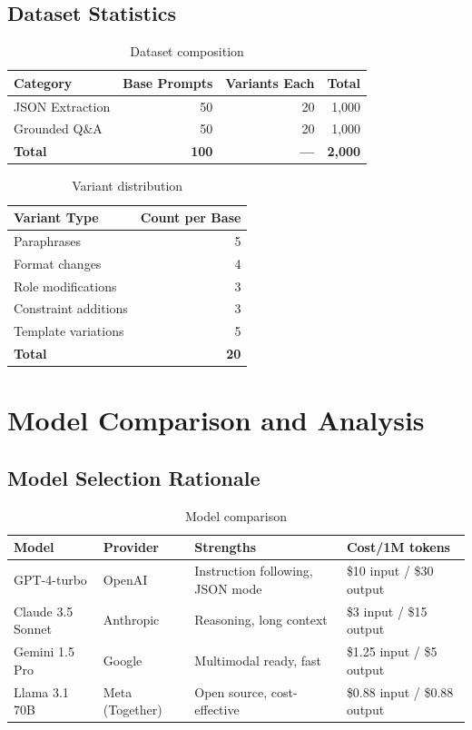 \documentclass[11pt,a4paper]{article}
\begin{document}
\subsection{Dataset Statistics}

\begin{table}[h]
\centering
\begin{tabular}{@{}lrrr@{}}
\toprule
\textbf{Category} & \textbf{Base Prompts} & \textbf{Variants Each} & \textbf{Total} \\ \midrule
JSON Extraction & 50 & 20 & 1,000 \\
Grounded Q\&A & 50 & 20 & 1,000 \\
\textbf{Total} & \textbf{100} & \textbf{—} & \textbf{2,000} \\ \bottomrule
\end{tabular}
\caption{Dataset composition}
\end{table}

\begin{table}[h]
\centering
\begin{tabular}{@{}lr@{}}
\toprule
\textbf{Variant Type} & \textbf{Count per Base} \\ \midrule
Paraphrases & 5 \\
Format changes & 4 \\
Role modifications & 3 \\
Constraint additions & 3 \\
Template variations & 5 \\
\textbf{Total} & \textbf{20} \\ \bottomrule
\end{tabular}
\caption{Variant distribution}
\end{table}

\section{Model Comparison and Analysis}

\subsection{Model Selection Rationale}

\begin{table}[h]
\centering
\small
\begin{tabular}{@{}p{3cm}p{3cm}p{3cm}p{3cm}@{}}
\toprule
\textbf{Model} & \textbf{Provider} & \textbf{Strengths} & \textbf{Cost/1M tokens} \\ \midrule
GPT-4-turbo & OpenAI & Instruction following, JSON mode & \$10 input / \$30 output \\
Claude 3.5 Sonnet & Anthropic & Reasoning, long context & \$3 input / \$15 output \\
Gemini 1.5 Pro & Google & Multimodal ready, fast & \$1.25 input / \$5 output \\
Llama 3.1 70B & Meta (Together) & Open source, cost-effective & \$0.88 input / \$0.88 output \\ \bottomrule
\end{tabular}
\caption{Model comparison}
\end{table}
\end{document}
